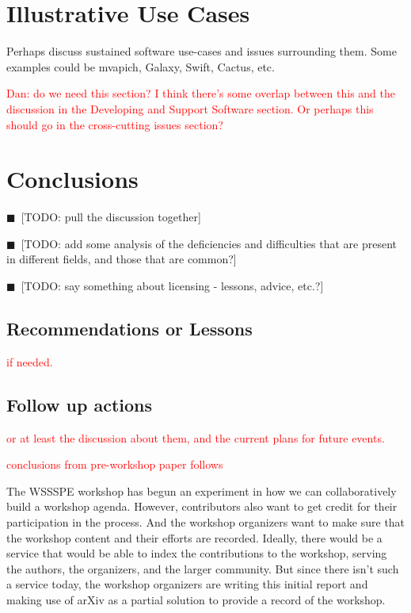 \documentclass[11pt, oneside]{amsart}
\newcommand{\todo}[1]{{\color{blue}$\blacksquare$~\textsf{[TODO: #1]}}}
\newcommand{\note}[1]{ {\textcolor{red}    { #1 }}}
\begin{document}
\section{Illustrative Use Cases} \label{sec:use-cases}


Perhaps discuss sustained software use-cases and issues surrounding
them. Some examples could be mvapich, Galaxy, Swift, Cactus, etc.

\note{Dan: do we need this section?  I think there's some overlap
  between this and the discussion in the Developing and Support
  Software section.  Or perhaps this should go in the cross-cutting
  issues section?}

\section{Conclusions} \label{sec:conclusions}


\todo{pull the discussion together}

\todo{add some analysis of the deficiencies and difficulties that are
  present in different fields, and those that are common?}

\todo{say something about licensing - lessons, advice, etc.?}

\subsection{Recommendations or Lessons}

\note{if needed.}

\subsection{Follow up actions}

\note{or at least the discussion about them, and the current plans for
  future events.}

\note{conclusions from pre-workshop paper follows}

The WSSSPE workshop has begun an experiment in how we can
collaboratively build a workshop agenda. However, contributors also
want to get credit for their participation in the process. And the
workshop organizers want to make sure that the workshop content and
their efforts are recorded.  Ideally, there would be a service that
would be able to index the contributions to the workshop, serving the
authors, the organizers, and the larger community. But since there
isn't such a service today, the workshop organizers are writing this
initial report and making use of arXiv as a partial solution to
provide a record of the workshop.
\end{document}
